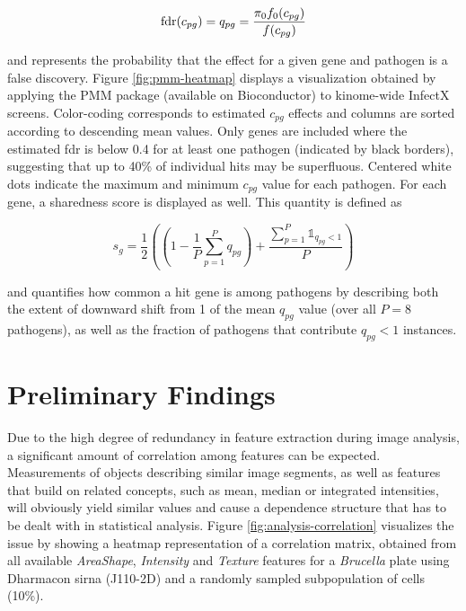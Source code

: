 

\begin{equation}
  \operatorname{fdr}(c_{pg}) = q_{pg} = \frac{\pi_0 f_0(c_{pg})}{f(c_{pg})}
\end{equation}

and represents the probability that the effect for a given gene and pathogen is a false discovery. Figure \ref{fig:pmm-heatmap} displays a visualization obtained by applying the PMM package (available on Bioconductor) to kinome-wide InfectX screens. Color-coding corresponds to estimated $c_{pg}$ effects and columns are sorted according to descending mean values. Only genes are included where the estimated \gls{fdr} is below 0.4 for at least one pathogen (indicated by black borders), suggesting that up to 40\% of individual hits may be superfluous. Centered white dots indicate the maximum and minimum $c_{pg}$ value for each pathogen. For each gene, a sharedness score is displayed as well. This quantity is defined as

\begin{equation}
  s_g = \frac{1}{2} \left(\left(1-\frac{1}{P}\sum_{p=1}^P q_{pg}\right) + \frac{\sum_{p=1}^P \mathds{1}_{q_{pg} < 1}}{P}\right)
\end{equation}

and quantifies how common a hit gene is among pathogens by describing both the extent of downward shift from 1 of the mean $q_{pg}$ value (over all $P=8$ pathogens), as well as the fraction of pathogens that contribute $q_{pg} < 1$ instances.

\section{Preliminary Findings}
Due to the high degree of redundancy in feature extraction during image analysis, a significant amount of correlation among features can be expected. Measurements of objects describing similar image segments, as well as features that build on related concepts, such as mean, median or integrated intensities, will obviously yield similar values and cause a dependence structure that has to be dealt with in statistical analysis. Figure \ref{fig:analysis-correlation} visualizes the issue by showing a heatmap representation of a correlation matrix, obtained from all available \textit{AreaShape}, \textit{Intensity} and \textit{Texture} features for a \textit{Brucella} plate using Dharmacon \gls{sirna} (J110-2D) and a randomly sampled subpopulation of cells (10\%).

